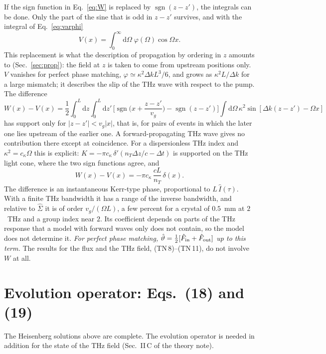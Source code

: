\documentclass[aps,pra,onecolumn,notitlepage,11pt,amsmath,amssymb,nofootinbib]{revtex4-2}
\newcommand{\Iop}{\hat I}
\newcommand{\dd}{\mathrm{d}}
\newcommand{\sgn}{\operatorname{sgn}}
\begin{document}
If the sign function in Eq.~\eqref{eq:W} is replaced by $\sgn(z-z')$, the
integrals can be done. Only the part of the sine that is odd in $z-z'$
survives, and with the integral of Eq.~\eqref{eq:varphi}
\begin{equation}
V(x)=\int_0^\infty\!\!\dd\Omega\;\varphi(\Omega)\cos\Omega x .
\label{eq:V}
\end{equation}
This replacement is what the description of propagation by ordering in $z$
amounts to (Sec.~\ref{sec:prop}): the field at $z$ is taken to come from
upstream positions only. $V$ vanishes for perfect phase matching,
$\varphi\simeq\kappa^2\Delta kL^3/6$, and grows as $\kappa^2L/\Delta k$ for a
large mismatch; it describes the slip of the THz wave with respect to the
pump. The difference
\begin{equation}
W(x)-V(x)=\frac12\int_0^L\!\!\dd z\!\int_0^L\!\!\dd z'\,
\Big[\sgn\Big(x+\frac{z-z'}{v_g}\Big)-\sgn(z-z')\Big]
\int\!\dd\Omega\,\kappa^2\sin[\Delta k(z-z')-\Omega x]
\end{equation}
has support only for $|z-z'|<v_g|x|$, that is, for pairs of events in which
the later one lies upstream of the earlier one. A forward-propagating THz
wave gives no contribution there except at coincidence. For a dispersionless
THz index and $\kappa^2=c_\kappa\Omega$ this is explicit:
$K=-\pi c_\kappa\,\delta'(n_T\Delta z/c-\Delta t)$ is supported on the THz
light cone, where the two sign functions agree, and
\begin{equation}
W(x)-V(x)=-\pi c_\kappa\,\frac{cL}{n_T}\,\delta(x).
\end{equation}
The difference is an instantaneous Kerr-type phase, proportional to
$L\,\Iop(\tau)$. With a finite THz bandwidth it has a range of the inverse
bandwidth, and relative to $\hat\Sigma$ it is of order $v_g/(\Omega L)$, a few
percent for a crystal of $0.5$~mm at $2$~THz and a group index near $2$. Its
coefficient depends on
parts of the THz response that a model with forward waves only does not
contain, so the model does not determine it. \emph{For perfect phase
matching, $\hat\vartheta=\tfrac12[\hat F_{\rm in}+\hat F_{\rm out}]$ up to
this term.} The results for the flux and the THz field, (TN\,8)--(TN\,11), do
not involve $W$ at all.

\section{Evolution operator: Eqs.~(18) and (19)}
\label{sec:U}

The Heisenberg solutions above are complete. The evolution operator is needed
in addition for the state of the THz field (Sec.~II\,C of the theory note).
\end{document}
